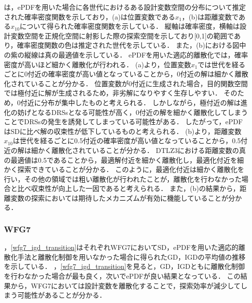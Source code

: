 \documentclass[../main/main]{subfiles}
\begin{document}
は，ePDFを用いた場合に各世代におけるある設計変数空間の分布について推定された確率密度関数を示しており，(a)は位置変数である$x_1$，(b)は距離変数である$x_{10}$について得られた確率密度関数を示している．
縦軸は確率密度，横軸は設計変数空間を正規化空間に射影した際の探索空間を示しており[0,1]の範囲であり，確率密度関数の色は推定された世代を示している．
また，(b)における図中の紫の縦線は真の最適値を示している．
ePDFを用いた適応的離散化では，確率密度が高いほど細かく離散化が行われる．
(a)より，位置変数$x_1$では世代を経るごとに0付近の確率密度が高い値となっていることから，0付近の解は細かく離散化されていることが分かる．
位置変数が0付近に生成された場合，目的関数空間では極付近に解が生成されるため，非劣解になりやすく生存しやすい．
そのため，0付近に分布が集中したものと考えられる．
しかしながら，極付近の解は進化の妨げとなるDRSsとなる可能性が高く，0付近の解を細かく離散化してしまうことでDRSsの発生を誘発してしまっている可能性がある．
したがって，ePDFはSDに比べ解の収束性が低下しているものと考えられる．
(b)より，距離変数$x_{10}$は世代を経るごとに0.5付近の確率密度が高い値となっていることから，0.5付近の解は細かく離散化されていることが分かる．
DTLZ3における距離変数の真の最適値は0.5であることから，最適解付近を細かく離散化し，最適化付近を細かく探索できていることが分かる．
このように，最適化付近は細かく離散化を行い，その他の領域では粗い離散化が行われたことが，離散化を行わなかった場合と比べ収束性が向上した一因であると考えられる．
また，(b)の結果から，距離変数の探索においては期待したメカニズムが有効に機能していることが分かる．

\subsubsection{WFG7}

，\ref{wfg7_igd_transition}はそれぞれWFG7においてSD，ePDFを用いた適応的離散化手法と離散化制御を用いなかった場合に得られたGD，IGDの平均値の推移を示している．
，\ref{wfg7_igd_transition}を見ると，GD，IGDともに離散化制御を行わなかった場合が最も良く，次いでePDFが良い結果となっている．
この結果から，WFG7においては設計変数を離散化することで，探索効率が減少してしまう可能性があることが分かる．
\end{document}
